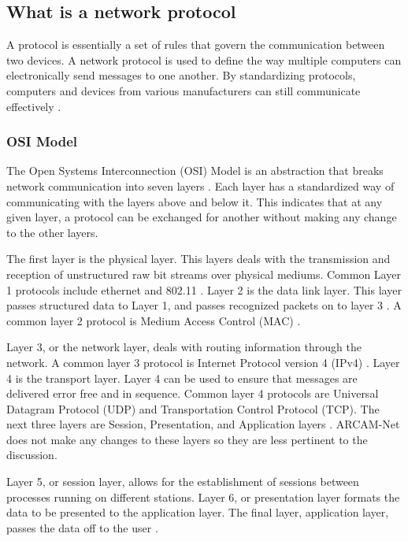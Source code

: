 \subsection{What is a network protocol}

A protocol is essentially a set of rules that govern the communication between two devices. A network protocol is used to define the way multiple computers can electronically send messages to one another. By standardizing protocols, computers and devices from various manufacturers can still communicate effectively \cite{6840086} \cite{0029}. 

\subsubsection{OSI Model}

The Open Systems Interconnection (OSI) Model is an abstraction that breaks network communication into seven layers \cite{6840086} \cite{0030}. Each layer has a standardized way of communicating with the layers above and below it. This indicates that at any given layer, a protocol can be exchanged for another without making any change to the other layers\cite{6840086}. 

The first layer is the physical layer. This layers deals with the transmission and reception of unstructured raw bit streams over physical mediums. Common Layer 1 protocols include ethernet and 802.11 \cite{6014631} \cite{0030}. Layer 2 is the data link layer. This layer passes structured data to Layer 1, and passes recognized packets on to layer 3 \cite{6840086}. A common layer 2 protocol is Medium Access Control (MAC) \cite{6014631} \cite{0030}. 

Layer 3, or the network layer, deals with routing information through the network. A common layer 3 protocol is Internet Protocol version 4 (IPv4) \cite{6014631} \cite{0031}. Layer 4 is the transport layer. Layer 4 can be used to ensure that messages are delivered error free and in sequence. Common layer 4 protocols are Universal Datagram Protocol (UDP) and Transportation Control Protocol (TCP). The next three layers are Session, Presentation, and Application layers \cite{6840086} \cite{0030}. ARCAM-Net does not make any changes to these layers so they are less pertinent to the discussion. 

Layer 5, or session layer, allows for the establishment of sessions between processes running on different stations. Layer 6, or presentation layer formats the data to be presented to the application layer. The final layer, application layer, passes the data off to the user \cite{6840086}. 

